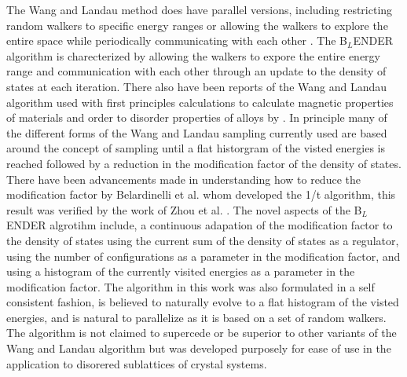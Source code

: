 \documentclass[aps,pre,reprint,superscriptaddress,showkeys]{revtex4-1}
\begin{document}
    The Wang and Landau method does have parallel versions, including  restricting random walkers to specific energy ranges or allowing the walkers to explore the entire space while periodically communicating with each other \cite{MP_Wang_Landau,P_imp_Wang_Landau, Hframe_Wang_Landau}. The B$_{L}$ENDER algorithm is charecterized by allowing the walkers to expore the entire energy range and communication with each other through an update to the density of states at each iteration. There also have been  reports of the Wang and Landau algorithm used with first principles calculations to calculate magnetic properties of materials and order to disorder properties of alloys by \cite{Eisenbach, FP_Wang_Landau_CuZn}. In principle many of the different forms of the Wang and Landau sampling currently used are based around the concept of sampling until a flat historgram of the visted energies is reached followed by a reduction in the modification factor of the density of states. There have been advancements made in understanding how to reduce the modification factor by Belardinelli et al. \cite{saturation} whom developed the 1/t algorithm, this result was verified by the work of Zhou et al. \cite{Optimal_modification}. The novel aspects of the B$_{L}$ENDER algrotihm include, a continuous adapation of the modification factor to the  density of states using the current sum of the density of states as a regulator, using the number of configurations as a parameter in the modification factor, and using a histogram of the currently visited energies as a parameter in the modification factor.  The algorithm in this work was also formulated in a self consistent fashion, is believed to naturally evolve to a flat histogram of the visted energies, and is natural to parallelize as it is based on a set of random walkers. The algorithm is not claimed to supercede or be superior to other variants of the Wang and Landau algorithm but was developed purposely  for ease of use in the application to disorered sublattices of crystal systems. 
\end{document}
